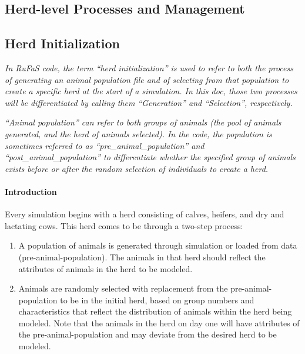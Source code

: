 \begin{refsection}
\section{Herd-level Processes and Management}
\vspace{0.5cm}

\subsection{Herd Initialization} \label{herdinit}
\vspace{0.5cm}

\begin{tcolorbox}[colback=white, colframe=black, title=Important Note]
\textit{In RuFaS code, the term “herd initialization” is used to refer to both the process of generating an animal population file and of selecting from that population to create a specific herd at the start of a simulation. In this doc, those two processes will be differentiated by calling them “Generation” and “Selection”, respectively. }
\vspace{0.2cm}

\textit{“Animal population” can refer to both groups of animals (the pool of animals generated, and the herd of animals selected). In the code, the population is sometimes referred to as “pre\_animal\_population” and “post\_animal\_population” to differentiate whether the specified group of animals exists before or after the random selection of individuals to create a herd. }
\end{tcolorbox}
\vspace{0.2cm}

\paragraph{Introduction}

Every simulation begins with a herd consisting of calves, heifers, and dry and lactating cows. This herd comes to be through a two-step process: 
\begin{enumerate}
    \item A population of animals is generated through simulation or loaded from data (pre-animal-population). The animals in that herd should reflect the attributes of animals in the herd to be modeled. 
    \item Animals are randomly selected with replacement from the pre-animal-population to be in the initial herd, based on group numbers and characteristics that reflect the distribution of animals within the herd being modeled. Note that the animals in the herd on day one will have attributes of the pre-animal-population and may deviate from the desired herd to be modeled.  
\end{enumerate}


\end{refsection}
